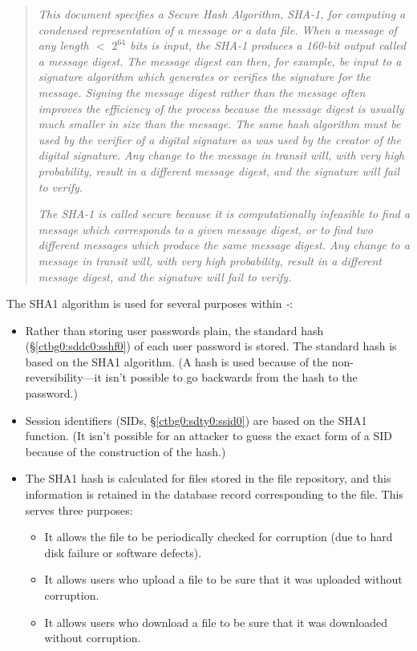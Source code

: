 \begin{quote}
\emph{This document specifies a Secure Hash Algorithm, SHA-1, for computing
a condensed representation of a message or a data file.  When a
message of any length $<$ $2^{64}$ bits is input, the SHA-1 produces a
160-bit output called a message digest.  The message digest can then,
for example, be input to a signature algorithm which generates or
verifies the signature for the message.  Signing the message digest
rather than the message often improves the efficiency of the process
because the message digest is usually much smaller in size than the
message.  The same hash algorithm must be used by the verifier of a
digital signature as was used by the creator of the digital
signature.  Any change to the message in transit will, with very high
probability, result in a different message digest, and the signature
will fail to verify.}

\emph{The SHA-1 is called secure because it is computationally infeasible
to find a message which corresponds to a given message digest, or to
find two different messages which produce the same message digest.
Any change to a message in transit will, with very high probability,
result in a different message digest, and the signature will fail to
verify.}
\end{quote}

The SHA1 algorithm is used for several purposes within
\emph{\productbasename{}-\productversion{}}:

\begin{itemize}
\item Rather than storing user passwords plain, 
      the standard hash (\S{}\ref{ctbg0:sddc0:sshf0}) of each
      user password is stored.  The standard hash is
      based on the SHA1 algorithm.  (A hash
      is used because of the non-reversibility---it isn't
      possible to go backwards from the hash to the password.)
\item Session identifiers (SIDs, \S{}\ref{ctbg0:sdty0:ssid0})
      are based on the SHA1 function.  (It isn't possible for
      an attacker to guess the exact form of a SID because of
      the construction of the hash.)
\item The SHA1 hash is calculated for files stored in the
      file repository, and this information is retained in the
      database record corresponding to the file.  This serves
      three purposes:
      
      \begin{itemize}
      \item It allows the file to be periodically checked for corruption
            (due to hard disk failure or software defects).
      \item It allows users who upload a file to be sure that it
            was uploaded without corruption.
      \item It allows users who download a file to be sure that
            it was downloaded without corruption.
      \end{itemize} 
\end{itemize}



